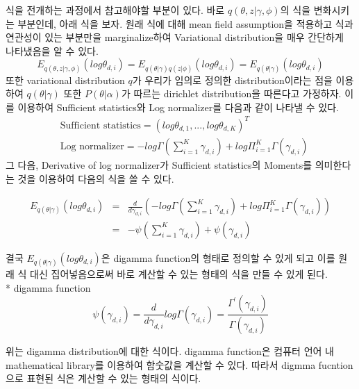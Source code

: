 \documentclass[draft=false]{oblivoir}
\begin{document}
식을 전개하는 과정에서 참고해야할 부분이 있다. 바로 $q(\theta,z|\gamma,\phi)$의 식을 변화시키는 부분인데, 아래 식을 보자. 원래 식에 대해  mean field assumption을 적용하고 식과 연관성이 있는 부분만을 marginalize하여 Variational distribution을 매우 간단하게 나타냈음을 알 수 있다.\\
\begin{equation}
E_{q(\theta,z|\gamma,\phi)}(log\theta_{d,i})=E_{q(\theta|\gamma)q(z|\phi)}(log\theta_{d,i})=E_{q(\theta|\gamma)}(log\theta_{d,i})
\end{equation}
또한 variational distribution $q$가 우리가 임의로 정의한 distribution이라는 점을 이용하여 $q(\theta|\gamma)$ 또한 $P(\theta|\alpha)$가 따르는 dirichlet distribution을 따른다고 가정하자. 이를 이용하여 Sufficient statistics와 Log normalizer를 다음과 같이 나타낼 수 있다.
\begin{eqnarray*}
&\text{Sufficient statistics} = (log\theta_{d,1},...,log\theta_{d,K})^{T}\nonumber\\
&\text{Log normalizer} = -log\Gamma(\sum^{K}_{i=1}\gamma_{d,i})+log\Pi^{K}_{i=1}\Gamma(\gamma_{d,i})\nonumber
\end{eqnarray*}
그 다음, Derivative of log normalizer가 Sufficient statistics의 Moments를 의미한다는 것을 이용하여 다음의 식을 쓸 수 있다. 

\begin{eqnarray}
E_{q(\theta|\gamma)}(log\theta_{d,i})\nonumber & = &\frac{d}{d\gamma_{d,i}}\left(-log\Gamma\left(\sum^{K}_{i=1}\gamma_{d,i}\right)+log\Pi^{K}_{i=1}\Gamma(\gamma_{d,i})\right)\nonumber\\ 
& = & -\psi\left(\sum^{K}_{i=1}\gamma_{d,i}\right)+\psi(\gamma_{d,i})
\end{eqnarray}


결국 $E_{q(\theta|\gamma)}(log\theta_{d,i})$은 digamma function의 형태로 정의할 수 있게 되고 이를 원래 식 대신 집어넣음으로써 바로 계산할 수 있는 형태의 식을 만들 수 있게 된다.\\

* digamma function
\begin{equation}
\psi(\gamma_{d,i}) = \frac{d}{d\gamma_{d,i}}log\Gamma(\gamma_{d,i}) = \frac{\Gamma^{'}(\gamma_{d,i})}{\Gamma(\gamma_{d,i})}\nonumber
\end{equation}

위는 digamma distribution에 대한 식이다. digamma function은 컴퓨터 언어 내 mathematical library를 이용하여 함숫값을 계산할 수 있다. 따라서 digmma fucntion으로 표현된 식은 계산할 수 있는 형태의 식이다.
\end{document}
